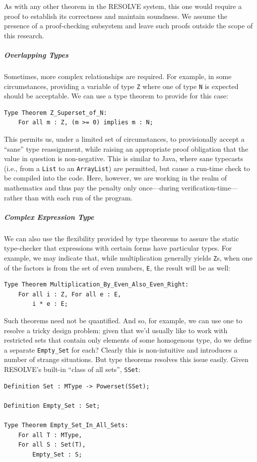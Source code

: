 As with any other theorem in the RESOLVE system, this one would require a proof to establish its correctness and maintain soundness.  We assume the presence of a proof-checking subsystem and leave such proofs outside the scope of this research.

\subparagraph{Overlapping Types}
Sometimes, more complex relationships are required.  For example, in some circumstances, providing a variable of type \texttt{Z} where one of type \texttt{N} is expected should be acceptable.  We can use a type theorem to provide for this case:

\begin{lstlisting}
Type Theorem Z_Superset_of_N:
	For all m : Z, (m >= 0) implies m : N;
\end{lstlisting}

This permits us, under a limited set of circumstances, to provisionally accept a ``sane'' type reassignment, while raising an appropriate proof obligation that the value in question is non-negative.  This is similar to Java, where sane typecasts (i.e., from a \texttt{List} to an \texttt{ArrayList}) are permitted, but cause a run-time check to be compiled into the code.  Here, however, we are working in the realm of mathematics and thus pay the penalty only once---during verification-time---rather than with each run of the program.

\subparagraph{Complex Expression Type}
We can also use the flexibility provided by type theorems to assure the static type-checker that expressions with certain forms have particular types.  For example, we may indicate that, while multiplication generally yields \texttt{Z}s, when one of the factors is from the set of even numbers, \texttt{E}, the result will be as well:

\begin{lstlisting}
Type Theorem Multiplication_By_Even_Also_Even_Right:
	For all i : Z, For all e : E,
		i * e : E;
\end{lstlisting}

Such theorems need not be quantified.  And so, for example, we can use one to resolve a tricky design problem: given that we'd usually like to work with restricted sets that contain only elements of some homogenous type, do we define a separate \texttt{Empty\_Set} for each?  Clearly this is non-intuitive and introduces a number of strange situations.  But type theorems resolves this issue easily.  Given RESOLVE's built-in ``class of all sets'', \texttt{SSet}:

\begin{lstlisting}
Definition Set : MType -> Powerset(SSet);

Definition Empty_Set : Set;

Type Theorem Empty_Set_In_All_Sets:
	For all T : MType,
	For all S : Set(T),
		Empty_Set : S; 
\end{lstlisting}

